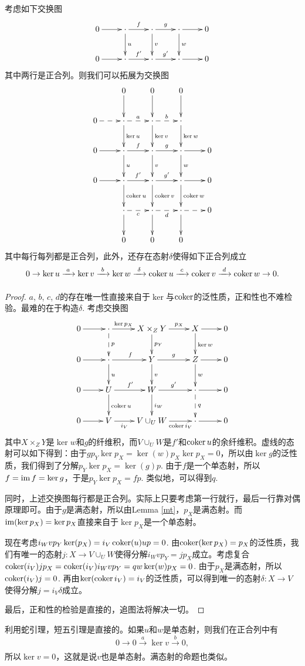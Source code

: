 \begin{lem}[蛇引理]\label{snake-lemma}
考虑如下交换图
\[
	\xymatrix{
	0\ar[r]&\cdot \ar[r]^{f}\ar[d]^{u}&\cdot \ar[r]^{g}\ar[d]^{v}&\cdot \ar[r]\ar[d]^{w}&0\\
	0\ar[r]&\cdot \ar[r]^{f'}&\cdot \ar[r]^{g'}&\cdot \ar[r]&0\\
	}
\]
其中两行是正合列。则我们可以拓展为交换图
\[
	\xymatrix{
	&0\ar[d]&0\ar[d]&0\ar[d]&\\
	0\ar@{-->}[r]&\cdot\ar@{-->}[r]^a\ar[d]^{\ker u}&\cdot\ar@{-->}[r]^b\ar[d]^{\ker v}&\cdot\ar[d]^{\ker w}&\\
	0\ar[r]&\cdot \ar[r]^{f}\ar[d]^{u}&\cdot \ar[r]^{g}\ar[d]^{v}&\cdot \ar[r]\ar[d]^{w}&0\\
	0\ar[r]&\cdot \ar[r]^{f'}\ar[d]^{\coker u}&\cdot \ar[r]^{g'}\ar[d]^{\coker v}&\cdot \ar[r]\ar[d]^{\coker w}&0\\
	&\cdot \ar@{-->}[r]_c\ar[d] &\cdot \ar@{-->}[r]_d\ar[d] &\cdot \ar@{-->}[r]\ar[d]& 0\\
	&0&0&0&\\
	}
\]
其中每行每列都是正合列，此外，还存在态射$\delta$使得如下正合列成立
\[
	0\to \ker u \xrightarrow[~~~]{a}\ker v \xrightarrow[~~~]{b}\ker w \xrightarrow[~~~]{\delta}\operatorname{coker} u \xrightarrow[~~~]{c}\operatorname{coker} v \xrightarrow[~~~]{d}\operatorname{coker} w \to 0.
\]
\end{lem}

\begin{proof}
$a$, $b$, $c$, $d$的存在唯一性直接来自于$\ker$与$\operatorname{coker}$的泛性质，正和性也不难检验。最难的在于构造$\delta$. 考虑交换图
\[
	\xymatrix{
	0\ar[r]&\cdot \ar[r]^-{\ker p_X}\ar@{-->}[d]^p&X\times_Z Y \ar[r]^-{p_X}\ar[d]^{p_Y}&X\ar[d]^{\ker w}\ar[r]&0\\
	0\ar[r]&\cdot \ar[r]^{f}\ar[d]^{u}&Y \ar[r]^{g}\ar[d]^{v}&Z \ar[d]^{w}\ar[r]&0\\
	0\ar[r]&U \ar[r]^{f'}\ar[d]^{\coker u}&W \ar[r]^{g'}\ar[d]^{i_W}&\cdot \ar@{-->}[d]^q\ar[r]&0\\
	0\ar[r]&V \ar[r]_-{i_V}&V\cup_U W \ar[r]_-{\coker i_V}&\cdot\ar[r]&0
	}
\]
其中$X\times_Z Y$是$\ker w$和$g$的纤维积，而$V\cup_U W$是$f'$和$\operatorname{coker} u$的余纤维积。虚线的态射可以如下得到：由于$gp_Y \ker p_X=\ker(w)p_X\ker p_X=0$，所以由$\ker g$的泛性质，我们得到了分解$p_Y\ker p_X=\ker(g)p$. 由于$f$是一个单态射，所以$f=\operatorname{im} f=\ker g$，于是$p_Y\ker p_X=fp$. 类似地，可以得到$q$.

同时，上述交换图每行都是正合列。实际上只要考虑第一行就行，最后一行靠对偶原理即可。由于$g$是满态射，所以由Lemma \ref{mt}，$p_X$是满态射。而$\operatorname{im}(\ker p_X)=\ker p_X$直接来自于$\ker p_X$是一个单态射。

现在考虑$i_Wvp_Y\ker(p_X)=i_V\operatorname{coker}(u)up=0$. 由$\operatorname{coker}(\ker p_X)=p_X$的泛性质，我们有唯一的态射$j:X\to V\cup_U W$使得分解$i_Wvp_Y=jp_X$成立。考虑复合$\operatorname{coker}(i_V)jp_X=\operatorname{coker}(i_V)i_Wvp_Y=qw\ker(w)p_X=0$. 由于$p_X$是满态射，所以$\operatorname{coker}(i_V)j=0$. 再由$\ker(\operatorname{coker} i_V)=i_V$的泛性质，可以得到唯一的态射$\delta:X\to V$使得分解$j=i_V \delta$成立。

最后，正和性的检验是直接的，追图法将解决一切。
\end{proof}

利用蛇引理，短五引理是直接的。如果$u$和$w$是单态射，则我们在正合列中有
\[
	0\to 0 \xrightarrow[~~~]{a}\ker v \xrightarrow[~~~]{b}0,
\]
所以$\ker v=0$，这就是说$v$也是单态射。满态射的命题也类似。